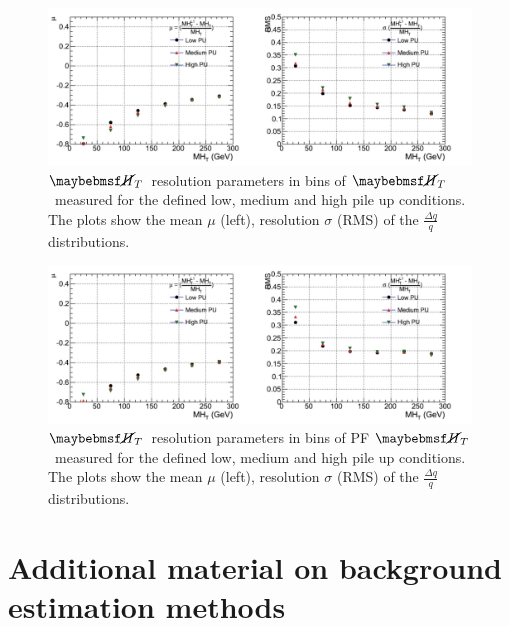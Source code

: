 \begin{figure}[h!]
  \vspace{20pt}
        \centering
        \includegraphics[width=1.0\textwidth]{plots/res_CaloMHT_summary.pdf}
        \caption[$\mht$~resolution parameters in bins of $\mht$~measured for the defined low, medium and high pile up conditions.]{$\mht$~resolution parameters in bins of $\mht$~measured for the defined low, medium and high pile up conditions. The plots show the mean $\mu$ (left), resolution $\sigma$ (RMS) of the $\frac{\Delta q}{q}$ distributions.}
        \label{fig:calomhtresultspu}
\end{figure}
\begin{figure}[h!]
  \vspace{20pt}
        \centering
        \includegraphics[width=1.0\textwidth]{plots/res_pfMHT_summary.pdf}
        \caption[$\mht$~resolution parameters in bins of PF $\mht$~measured for the defined low, medium and high pile up conditions.]{$\mht$~resolution parameters in bins of PF $\mht$~measured for the defined low, medium and high pile up conditions. The plots show the mean $\mu$ (left), resolution $\sigma$ (RMS) of the $\frac{\Delta q}{q}$ distributions.}
        \label{fig:pfmhtresultspu}
\end{figure}

\chapter{Additional material on background estimation methods}

